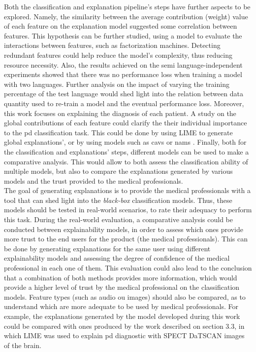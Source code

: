 Both the classification and explanation pipeline's steps have further aspects to be explored. Namely, the similarity between the average contribution (weight) value of each feature on the explanation model suggested some correlation between features. This hypothesis can be further studied, using a model to evaluate the interactions between features, such as factorization machines. Detecting redundant features could help reduce the model's complexity, thus reducing resource necessity. Also, the results achieved on the semi language-independent experiments showed that there was no performance loss when training a model with two languages. Further analysis on the impact of varying the training percentage of the test language would shed light into the relation between data quantity used to re-train a model and the eventual performance loss. Moreover, this work focuses on explaining the diagnosis of each patient. A study on the global contributions of each feature could clarify the their individual importance to the \gls{pd} classification task. This could be done by using LIME to generate global explanations', or by using models such as \gls{cav}s \cite{TCAV} or \gls{nam}s \cite{NAM}. Finally, both for the classification and explanations' steps, different models can be used to make a comparative analysis. This would allow to both assess the classification ability of multiple models, but also to compare the explanations generated by various models and the trust provided to the medical professionals. \\
The goal of generating explanations is to provide the medical professionals with a tool that can shed light into the \textit{black-box} classification models. Thus, these models should be tested in real-world scenarios, to rate their adequacy to perform this task. During the real-world evaluation, a comparative analysis could be conducted between explainability models, in order to assess which ones provide more trust to the end users for the product (the medical professionals). This can be done by generating explanations for the same user using different explainability models and assessing the degree of confidence of the medical professional in each one of them. This evaluation could also lead to the conclusion that a combination of both methods provides more information, which would provide a higher level of trust by the medical professional on the classification models. Feature types (such as audio ou images) should also be compared, as to understand which are more adequate to be used by medical professionals. For example, the explanations generated by the model developed during this work could be compared with ones produced by the work described on section 3.3, in which LIME was used to explain \gls{pd} diagnostic with SPECT DaTSCAN images of the brain. 

